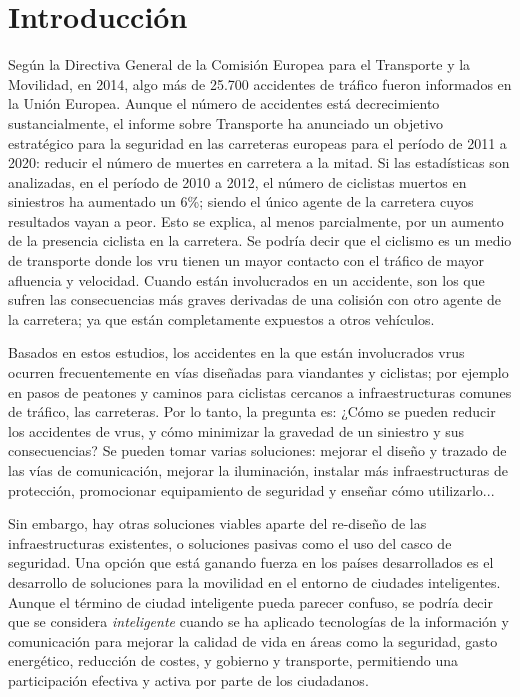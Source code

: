 \chapter{Introducción}
Según la Directiva General de la Comisión Europea para el Transporte y la Movilidad, en 2014, algo más de 25.700
accidentes de tráfico fueron informados en la Unión Europea. Aunque el número de accidentes está decrecimiento
sustancialmente, el informe sobre Transporte ha anunciado un objetivo estratégico para la seguridad en las carreteras
europeas para el período de 2011 a 2020: reducir el número de muertes en carretera a la mitad. Si las estadísticas
son analizadas, en el período de 2010 a 2012, el número de ciclistas muertos en siniestros ha aumentado un 6\%;
siendo el único agente de la carretera cuyos resultados vayan a peor. Esto se explica, al menos parcialmente, por un
aumento de la presencia ciclista en la carretera. Se podría decir que el ciclismo es un medio de transporte donde los
\gls{vru} tienen un mayor contacto con el tráfico de mayor afluencia y velocidad. Cuando están involucrados en un
accidente, son los que sufren las consecuencias más graves derivadas de una colisión con otro agente de la carretera;
ya que están completamente expuestos a otros vehículos.

Basados en estos estudios, los accidentes en la que están involucrados \gls{vru}s ocurren frecuentemente en vías
diseñadas para viandantes y ciclistas; por ejemplo en pasos de peatones y caminos para ciclistas cercanos a
infraestructuras comunes de tráfico, las carreteras. Por lo tanto, la pregunta es: ¿Cómo se pueden reducir los
accidentes de \gls{vru}s, y cómo minimizar la gravedad de un siniestro y sus consecuencias? Se pueden tomar
varias soluciones: mejorar el diseño y trazado de las vías de comunicación, mejorar la iluminación, instalar más
infraestructuras de protección, promocionar equipamiento de seguridad y enseñar cómo utilizarlo...

Sin embargo, hay otras soluciones viables aparte del re-diseño de las infraestructuras existentes, o soluciones pasivas
como el uso del casco de seguridad. Una opción que está ganando fuerza en los países desarrollados es el desarrollo de
soluciones para la movilidad en el entorno de ciudades inteligentes. Aunque el término de ciudad inteligente
pueda parecer confuso, se podría decir que se considera \emph{inteligente} cuando se ha aplicado tecnologías de
la información y comunicación para mejorar la calidad de vida en áreas como la seguridad, gasto energético,
reducción de costes, y gobierno y transporte, permitiendo una participación efectiva y activa por parte de los
ciudadanos.

